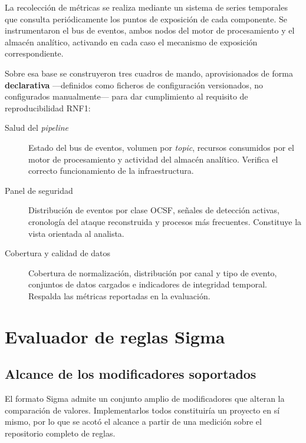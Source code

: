 La recolección de métricas se realiza mediante un sistema de series temporales que consulta
periódicamente los puntos de exposición de cada componente. Se instrumentaron el bus de
eventos, ambos nodos del motor de procesamiento y el almacén analítico, activando en cada
caso el mecanismo de exposición correspondiente.

Sobre esa base se construyeron tres cuadros de mando, aprovisionados de forma
\textbf{declarativa} —definidos como ficheros de configuración versionados, no configurados
manualmente— para dar cumplimiento al requisito de reproducibilidad RNF1:

\begin{description}
    \item[Salud del \textit{pipeline}] Estado del bus de eventos, volumen por \textit{topic},
    recursos consumidos por el motor de procesamiento y actividad del almacén analítico.
    Verifica el correcto funcionamiento de la infraestructura.
    \item[Panel de seguridad] Distribución de eventos por clase OCSF, señales de detección
    activas, cronología del ataque reconstruida y procesos más frecuentes. Constituye la
    vista orientada al analista.
    \item[Cobertura y calidad de datos] Cobertura de normalización, distribución por canal y
    tipo de evento, conjuntos de datos cargados e indicadores de integridad temporal. Respalda
    las métricas reportadas en la evaluación.
\end{description}


\section{Evaluador de reglas Sigma}
\label{anx:evaluador-sigma}

\subsection{Alcance de los modificadores soportados}

El formato Sigma admite un conjunto amplio de modificadores que alteran la comparación de
valores. Implementarlos todos constituiría un proyecto en sí mismo, por lo que se acotó el
alcance a partir de una medición sobre el repositorio completo de reglas.

